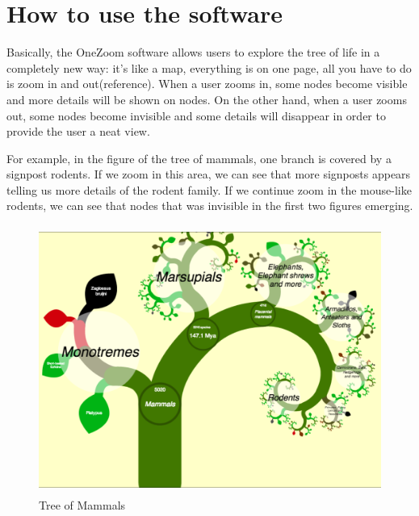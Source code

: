 \documentclass[MSc]{icldt}
\begin{document}


\section{How to use the software}
Basically, the OneZoom software allows users to explore the tree of life in a completely new way: it's like a map, everything is on one page, all you have to do is zoom in and out(reference). When a user zooms in, some nodes become visible and more details will be shown on nodes. On the other hand, when a user zooms out, some nodes become invisible and some details will disappear in order to provide the user a neat view. 

For example, in the figure of the tree of mammals, one branch is covered by a signpost rodents. If we zoom in this area, we can see that more signposts appears telling us more details of the rodent family. If we continue zoom in the mouse-like rodents, we can see that nodes that was invisible in the first two figures emerging.

\begin{figure}[H]
  \centering
  \includegraphics [width=15cm,height=8.8cm]{Mammal}
  \caption{Tree of Mammals}
  \label{fig:mammal}
\end{figure}
\end{document}
